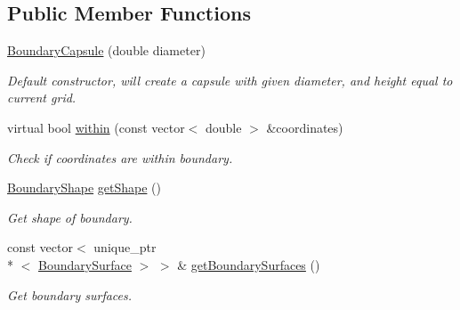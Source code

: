 \subsection*{Public Member Functions}
\begin{DoxyCompactItemize}
\item 
\hyperlink{classBoundaryCapsule_a8a5ab010ef57a344a1cb0a233572b0e1}{Boundary\+Capsule} (double diameter)
\begin{DoxyCompactList}\small\item\em Default constructor, will create a capsule with given diameter, and height equal to current grid. \end{DoxyCompactList}\item 
virtual bool \hyperlink{classBoundaryCapsule_a9e462a1fbb221933735c35df1e7eb75d}{within} (const vector$<$ double $>$ \&coordinates)
\begin{DoxyCompactList}\small\item\em Check if coordinates are within boundary. \end{DoxyCompactList}\item 
\hyperlink{Boundary_8h_a0099b369f2bc119c1b54728734b41132}{Boundary\+Shape} \hyperlink{classBoundary_a20d2121527b207eed35f6719393e3499}{get\+Shape} ()
\begin{DoxyCompactList}\small\item\em Get shape of boundary. \end{DoxyCompactList}\item 
const vector$<$ unique\+\_\+ptr\\*
$<$ \hyperlink{classBoundarySurface}{Boundary\+Surface} $>$ $>$ \& \hyperlink{classBoundary_acfa6640f65c432e339108887913539eb}{get\+Boundary\+Surfaces} ()
\begin{DoxyCompactList}\small\item\em Get boundary surfaces. \end{DoxyCompactList}\end{DoxyCompactItemize}
